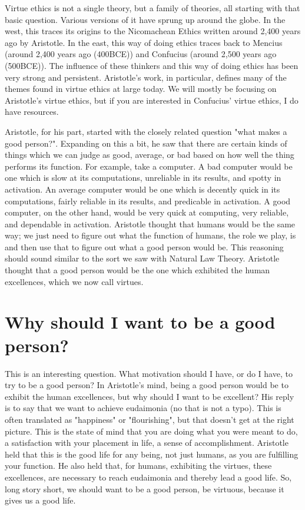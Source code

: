 Virtue ethics is not a single theory, but a family of theories, all starting with that basic question. Various versions of it have sprung up around the globe. In the west, this traces its origins to the Nicomachean Ethics written around 2,400 years ago by Aristotle. In the east, this way of doing ethics traces back to Mencius (around 2,400 years ago (400BCE)) and Confucius (around 2,500 years ago (500BCE)). The influence of these thinkers and this way of doing ethics has been very strong and persistent. Aristotle’s work, in particular, defines many of the themes found in virtue ethics at large today.  We will mostly be focusing on Aristotle’s virtue ethics, but if you are interested in Confucius’ virtue ethics, I do have resources.

Aristotle, for his part, started with the closely related question "what makes a good person?". Expanding on this a bit, he saw that there are certain kinds of things which we can judge as good, average, or bad based on how well the thing performs its function. For example, take a computer. A bad computer would be one which is slow at its computations, unreliable in its results, and spotty in activation. An average computer would be one which is decently quick in its computations, fairly reliable in its results, and predicable in activation. A good computer, on the other hand, would be very quick at computing, very reliable, and dependable in activation. Aristotle thought that humans would be the same way; we just need to figure out what the function of humans, the role we play, is and then use that to figure out what a good person would be. This reasoning should sound similar to the sort we saw with Natural Law Theory. Aristotle thought that a good person would be the one which exhibited the human excellences, which we now call virtues. 

\section{Why should I want to be a good person?}

This is an interesting question. What motivation should I have, or do I have, to try to be a good person? In Aristotle's mind, being a good person would be to exhibit the human excellences, but why should I want to be excellent? His reply is to say that we want to achieve eudaimonia (no that is not a typo). This is often translated as "happiness" or "flourishing", but that doesn't get at the right picture. This is the state of mind that you are doing what you were meant to do, a satisfaction with your placement in life, a sense of accomplishment. Aristotle held that this is the good life for any being, not just humans, as you are fulfilling your function. He also held that, for humans, exhibiting the virtues, these excellences, are necessary to reach eudaimonia and thereby lead a good life. So, long story short, we should want to be a good person, be virtuous, because it gives us a good life. 

